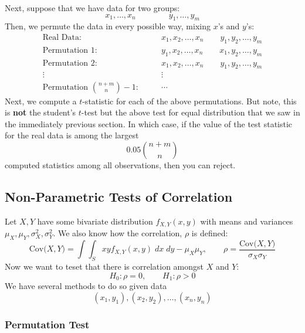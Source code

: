 \documentclass[a4paper,12pt]{scrartcl}
\begin{document}
Next, suppose that we have data for two groups:
   \[ x_1, \ldots, x_n \qquad \qquad y_1, \ldots, y_m \]
Then, we permute the data in every possible way, mixing $x$'s and
$y$'s:
\begin{align*}
   \text{Real Data:} & \qquad
      x_1, x_2, \ldots, x_n \qquad y_1, y_2, \ldots, y_m\\
   \text{Permutation 1:} & \qquad
      y_1, x_2, \ldots, x_n \qquad x_1, y_2, \ldots, y_m\\
   \text{Permutation 2:} & \qquad
      x_1, x_2, \ldots, x_n \qquad y_1, y_2, \ldots, y_m\\
   \vdots \qquad & \qquad \vdots\\
   \text{Permutation $\binom{n+m}{n}-1$:} & \qquad \cdots
\end{align*}
Next, we compute a $t$-statistic for each of the above permutations.
But note, this is \textbf{not} the student's $t$-test but the
above test for equal distribution that we saw in the immediately
previous section.  In which case, if the value of the test statistic
for the real data is among the largest
   \[ 0.05 \binom{n+m}{n} \]
computed statistics among all observations, then you can reject.


\newpage
\subsection{Non-Parametric Tests of Correlation}

Let $X,Y$ have some bivariate distribution $f_{X,Y}(x,y)$ with
means and variances $\mu_X, \mu_Y, \sigma^2_X, \sigma^2_Y$.
We also know how the correlation, $\rho$ is defined:
\[ \text{Cov($X,Y$)} = \int\int_S xy f_{X,Y}(x,y) \; dx \; dy -
   \mu_X \mu_Y, \qquad \rho = \frac{\text{Cov($X,Y$)}}{\sigma_X
   \sigma_Y} \]
Now we want to teset that there is correlation amongst $X$ and $Y$:
   \[ H_0: \rho = 0, \qquad H_1: \rho > 0 \]
We have several methods to do so given data
   \[ (x_1, y_1), (x_2, y_2), \ldots, (x_n, y_n) \]

\subsubsection{Permutation Test}
\end{document}
